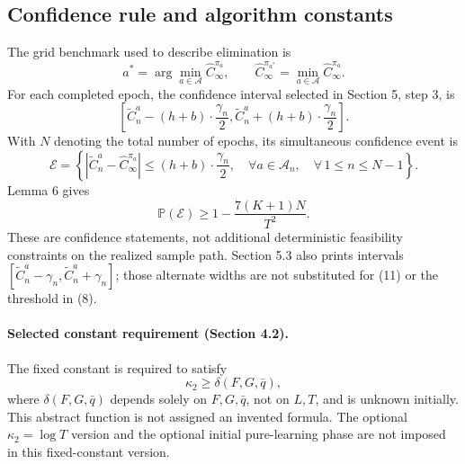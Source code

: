 \documentclass{article}
\begin{document}
\subsection*{Confidence rule and algorithm constants}
The grid benchmark used to describe elimination is
\[
a^*=\arg\min_{a\in\mathcal A}\hat C_\infty^{\pi_a},\qquad
\hat C_\infty^{\pi_{a^*}}=\min_{a\in\mathcal A}\hat C_\infty^{\pi_a}.
\]
For each completed epoch, the confidence interval selected in Section 5, step 3, is
\[
\left[\tilde C_n^a-(h+b)\cdot\frac{\gamma_n}{2},
      \tilde C_n^a+(h+b)\cdot\frac{\gamma_n}{2}\right].
\]
With \(N\) denoting the total number of epochs, its simultaneous confidence event is
\begin{equation}
\mathcal E=\left\{
\left|\tilde C_n^a-\hat C_\infty^{\pi_a}\right|
\leq(h+b)\cdot\frac{\gamma_n}{2},
\quad\forall a\in\mathcal A_n,\quad\forall\,1\leq n\leq N-1
\right\}.\tag{11}
\end{equation}
Lemma 6 gives
\[
\mathbb P(\mathcal E)\geq1-\frac{7(K+1)N}{T^2}.
\]
These are confidence statements, not additional deterministic feasibility constraints on the realized sample path. Section 5.3 also prints intervals \([\tilde C_n^a-\gamma_n,\tilde C_n^a+\gamma_n]\); those alternate widths are not substituted for (11) or the threshold in (8).

\paragraph{Selected constant requirement (Section 4.2).}
The fixed constant is required to satisfy
\[
\kappa_2\geq\delta(F,G,\bar q),
\]
where \(\delta(F,G,\bar q)\) depends solely on \(F,G,\bar q\), not on \(L,T\), and is unknown initially. This abstract function is not assigned an invented formula. The optional \(\kappa_2=\log T\) version and the optional initial pure-learning phase are not imposed in this fixed-constant version.
\end{document}
